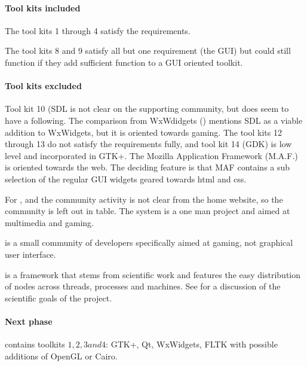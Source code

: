 \paragraph{Tool kits included} The tool kits 1 through 4 satisfy the
requirements.  

The tool kits 8 and 9 satisfy all but one requirement (the GUI) but could still
function if they add sufficient function to a GUI oriented toolkit. 

\paragraph{Tool kits excluded} Tool kit 10 ({\sf SDL} is not clear on the
supporting community, but does seem to have a following.  The comparison from
WxWdidgets (\cite{wxwidget:comparison}) mentions {\sf SDL} as a viable addition
to WxWidgets, but it is oriented towards gaming. The tool kits 12 through 13 do
not satisfy the requirements fully, and tool kit 14 (GDK) is low level and
incorporated in {\sf GTK+}.  The Mozilla Application Framework ({\sf M.A.F.})
is oriented towards the web. The deciding feature is that {\sf MAF} contains a
sub selection of the regular GUI widgets geared towards html and css.

For ,  and  the community activity is not clear from
the home website, so the community is left out in table. The system  is
a one man project and aimed at multimedia and gaming. 

 is a small community of developers specifically aimed at gaming, not graphical
user interface.

 is a framework that stems from scientific work and features the easy
distribution of nodes across threads, processes and machines.  See
\cite{greed:gled} for a discussion of the scientific goals of the 
project.

\paragraph{Next phase} contains toolkits $1, 2, 3 and 4$: {\sf GTK+, Qt,
WxWidgets, FLTK} with possible additions of OpenGL or Cairo. 

